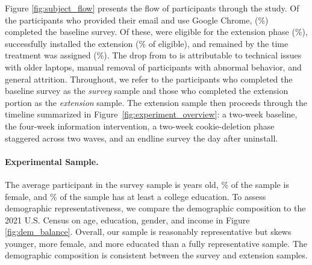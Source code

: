 \documentclass[12pt]{article}
\theoremstyle{definition}
\theoremstyle{remark}
\begin{document}
Figure \ref{fig:subject_flow} presents the flow of participants through the study. Of the \fullCohortN{} participants who provided their email and use Google Chrome, \baselineSurveyN{} (\baselineCompletionPct{}\%) completed the baseline survey. Of these, \eligibleN{} were eligible for the extension phase (\eligiblePct{}\%), \installedN{} successfully installed the extension (\installedPctOfEligible{}\% of eligible), and \remainedN{} remained by the time treatment was assigned (\remainedPct{}\%). The drop from \installedN{} to \remainedN{} is attributable to technical issues with older laptops, manual removal of participants with abnormal behavior, and general attrition. Throughout, we refer to the participants who completed the baseline survey as the \textit{survey} sample and those who completed the extension portion as the \textit{extension} sample. The extension sample then proceeds through the timeline summarized in Figure~\ref{fig:experiment_overview}: a two-week baseline, the four-week information intervention, a two-week cookie-deletion phase staggered across two waves, and an endline survey the day after uninstall.

\paragraph{Experimental Sample.} The average participant in the survey sample is \surveyMeanAge{} years old, \surveyFemalePct{}\% of the sample is female, and \surveyCollegePct{}\% of the sample has at least a college education. To assess demographic representativeness, we compare the demographic composition to the 2021 U.S. Census on age, education, gender, and income in Figure \ref{fig:dem_balance}. Overall, our sample is reasonably representative but skews younger, more female, and more educated than a fully representative sample. The demographic composition is consistent between the survey and extension samples.
\end{document}
